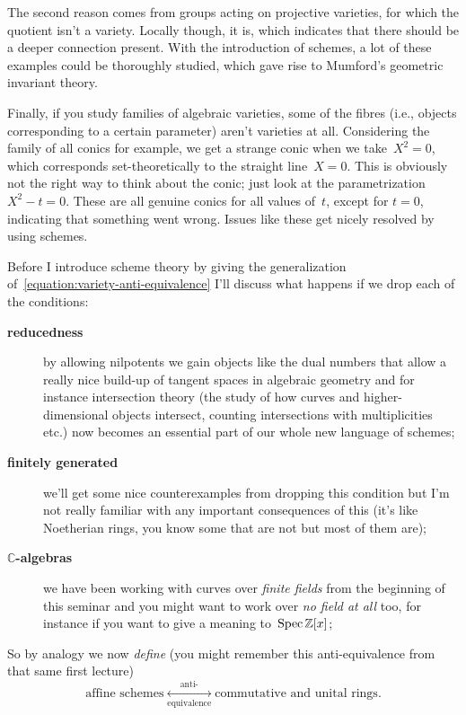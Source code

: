 The second reason comes from groups acting on projective varieties, for which the quotient isn't a variety. Locally though, it is, which indicates that there should be a deeper connection present. With the introduction of schemes, a lot of these examples could be thoroughly studied, which gave rise to Mumford's geometric invariant theory.

Finally, if you study families of algebraic varieties, some of the fibres (i.e., objects corresponding to a certain parameter) aren't varieties at all. Considering the family of all conics for example, we get a strange conic when we take~$X^{2}=0$, which corresponds set-theoretically to the straight line~$X=0$. This is obviously not the right way to think about the conic; just look at the parametrization~$X^{2}-t=0$. These are all genuine conics for all values of~$t$, except for $t=0$, indicating that something went wrong. Issues like these get nicely resolved by using schemes. 

Before I introduce scheme theory by giving the generalization of~\eqref{equation:variety-anti-equivalence} I'll discuss what happens if we drop each of the conditions:
\begin{description}
  \item[\textbf{reducedness}] by allowing nilpotents we gain objects like the dual numbers that allow a really nice build-up of tangent spaces in algebraic geometry and for instance intersection theory (the study of how curves and higher-dimensional objects intersect, counting intersections with multiplicities etc.) now becomes an essential part of our whole new language of schemes;
  \item[\textbf{finitely generated}] we'll get some nice counterexamples from dropping this condition but I'm not really familiar with any important consequences of this (it's like Noetherian rings, you know some that are not but most of them are);
  \item[\textbf{$\mathbb{C}$-algebras}] we have been working with curves over \emph{finite fields} from the beginning of this seminar and you might want to work over \emph{no field at all} too, for instance if you want to give a meaning to~$\operatorname{Spec}\mathbb{Z}[x]$;
\end{description}

So by analogy we now \emph{define} (you might remember this anti-equivalence from that same first lecture)
\begin{equation}
  \text{affine schemes} \underset{\text{equivalence}}{\overset{\text{anti-}}{\longleftrightarrow}} \text{commutative and unital rings}.
  \label{equation:scheme-anti-equivalence}
\end{equation}

